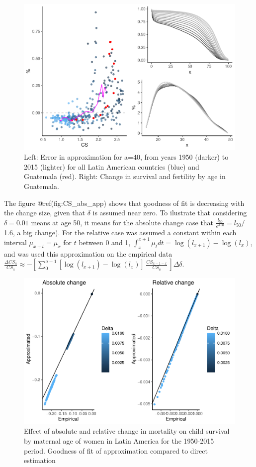 \documentclass[
]{article}
\begin{document}
\begin{figure}
\centering
\includegraphics{paper_files/figure-latex/plot_CS_aprox-1.pdf}
\caption{Left: Error in approximation for a=40, from years 1950 (darker)
to 2015 (lighter) for all Latin American countries (blue) and Guatemala
(red). Right: Change in survival and fertility by age in Guatemala.}
\end{figure}

The figure @ref(fig:CS\_abs\_app) shows that goodness of fit is
decreasing with the change size, given that \(\delta\) is assumed near
zero. To ilustrate that considering \(\delta=0.01\) means at age 50, it
means for the absolute change case that
\(\frac{l_{50}}{e^{\delta\,50}} = l_{50}/\) 1.6, a big change). For the
relative case was assumed a constant within each interval
\(\mu_{x+t}=\mu_x\) for \(t\) between 0 and 1,
\(\int_{x}^{x+1}{\mu_t dt} = \log(l_{x+1})-\log(l_{x})\), and was used
this approximation on the empirical data
\(\frac{\Delta CS_{a}}{CS_a} \approx - \left[\sum_{0}^{a-1}{[\log(l_{x+1})-\log(l_{x})]\, \frac{CS_{a-1-x}}{CS_a}\,}\right] \Delta \delta\).

\begin{figure}
\centering
\includegraphics{paper_files/figure-latex/CS_abs_app-1.pdf}
\caption{Effect of absolute and relative change in mortality on child
survival by maternal age of women in Latin America for the 1950-2015
period. Goodness of fit of approximation compared to direct estimation}
\end{figure}
\end{document}

